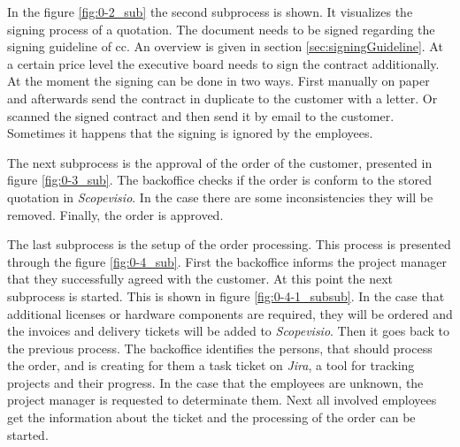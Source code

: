 In the figure \ref{fig:0-2_sub} the second subprocess is shown. It visualizes the signing process of a quotation. The document needs to be signed regarding the signing guideline of \gls{cc}. An overview is given in section \ref{sec:signingGuideline}. At a certain price level the executive board needs to sign the contract additionally. At the moment the signing can be done in two ways. First manually on paper and afterwards send the contract in duplicate to the customer with a letter. Or scanned the signed contract and then send it by email to the customer. Sometimes it happens that the signing is ignored by the employees.

The next subprocess is the approval of the order of the customer, presented in figure \ref{fig:0-3_sub}. The backoffice checks if the order is conform to the stored quotation in \textit{Scopevisio}. In the case there are some inconsistencies they will be removed. Finally, the order is approved.

The last subprocess is the setup of the order processing. This process is presented through the figure \ref{fig:0-4_sub}. First the backoffice informs the project manager that they successfully agreed with the customer. At this point the next subprocess is started. This is shown in figure \ref{fig:0-4-1_subsub}. In the case that additional licenses or hardware components are required, they will be ordered and the invoices and delivery tickets will be added to \textit{Scopevisio}. Then it goes back to the previous process. \newline
The backoffice identifies the persons, that should process the order, and is creating for them a task ticket on \textit{Jira}, a tool for tracking projects and their progress. In the case that the employees are unknown, the project manager is requested to determinate them. Next all involved employees get the information about the ticket and the processing of the order can be started.

